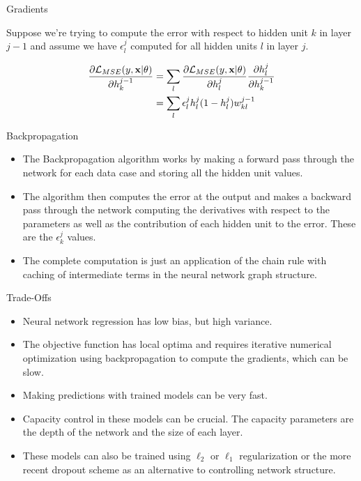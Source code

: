 \documentclass[serif,xcolor=pdftex,dvipsnames,table,hyperref={bookmarks=false,breaklinks}]{beamer}
\begin{document}
\begin{frame}[t]{Gradients}

Suppose we're trying to compute the error with respect to hidden unit $k$ in layer
$j-1$ and assume we have $\epsilon^{j}_l$ computed for all hidden units $l$ in layer $j$.

\begin{align}
\frac{\partial{\mathcal{L}_{MSE}(y,{\mathbf{x}}|\theta)}}{\partial{h_k^{j-1}}} 
 &= \sum_{l}\frac{\partial{\mathcal{L}_{MSE}(y,{\mathbf{x}}|\theta)}}{\partial{h_l^{j}}}\frac{\partial{h_l^{j}}}{\partial{h_{k}^{j-1}}} \\
 &= \sum_{l}\epsilon^{j}_l h_l^{j}(1-h_l^{j}) w_{kl}^{j-1}
\end{align}
 
\end{frame}

\begin{frame}[t]{Backpropagation}

\begin{itemize}
\item The Backpropagation algorithm works by making a forward pass through the network
for each data case and storing all the hidden unit values.

\pause\item The algorithm then computes the error at the output and makes a backward pass through
the network computing the derivatives with respect to the parameters as well as the contribution
of each hidden unit to the error. These are the $\epsilon_{k}^j$ values.

\pause\item The complete computation is just an application of the chain rule with caching of
intermediate terms in the neural network graph structure.
\end{itemize}

\end{frame}

\begin{frame}[t]{Trade-Offs}

\begin{itemize}
\item Neural network regression has low bias, but high variance.

\pause\item The objective function has local optima and requires
iterative numerical optimization using backpropagation to
compute the gradients, which can be slow.

\pause\item Making predictions with trained models can be very fast.

\pause\item Capacity control in these models can be crucial. The capacity
parameters are the depth of the network and the size of each layer.

\pause\item These models can also be trained using $\ell_2$ or $\ell_1$ regularization
or the more recent dropout scheme as an alternative to controlling
network structure.

\end{itemize}

\end{frame}
\end{document}
